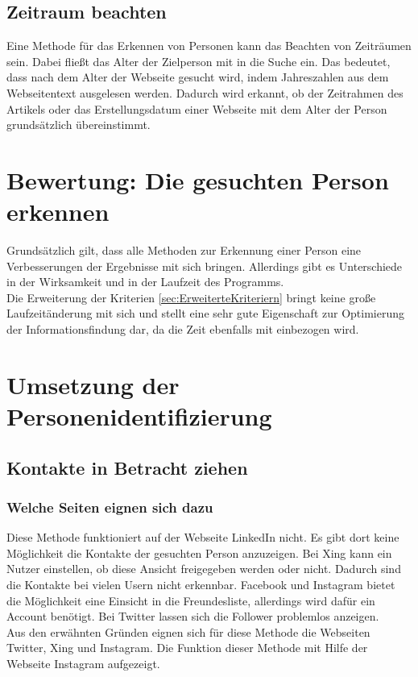 	\subsection{Zeitraum beachten}
	Eine Methode für das Erkennen von Personen kann das Beachten von Zeiträumen sein. Dabei fließt das Alter der Zielperson mit in die Suche ein. Das bedeutet, dass nach dem Alter der Webseite gesucht wird, indem Jahreszahlen aus dem Webseitentext ausgelesen werden. Dadurch wird erkannt, ob der Zeitrahmen des Artikels oder das Erstellungsdatum einer Webseite mit dem Alter der Person grundsätzlich übereinstimmt.
	
	
\section{Bewertung: Die gesuchten Person erkennen}
Grundsätzlich gilt, dass alle Methoden zur Erkennung einer Person eine Verbesserungen der Ergebnisse mit sich bringen. Allerdings gibt es Unterschiede in der Wirksamkeit und in der Laufzeit des Programms.\\
Die Erweiterung der Kriterien \ref{sec:ErweiterteKriteriern} bringt keine große Laufzeitänderung mit sich und stellt eine sehr gute Eigenschaft zur Optimierung der Informationsfindung dar, da die Zeit ebenfalls mit einbezogen wird.

\section{Umsetzung der Personenidentifizierung}
	\subsection{Kontakte in Betracht ziehen}
		\subsubsection{Welche Seiten eignen sich dazu}
		Diese Methode funktioniert auf der Webseite LinkedIn nicht. Es gibt dort keine Möglichkeit die Kontakte der gesuchten Person anzuzeigen. Bei Xing kann ein Nutzer einstellen, ob diese Ansicht freigegeben werden oder nicht. Dadurch sind die Kontakte bei vielen Usern nicht erkennbar. Facebook und Instagram bietet die Möglichkeit eine Einsicht in die Freundesliste, allerdings wird dafür ein Account benötigt. Bei Twitter lassen sich die Follower problemlos anzeigen.\\
		Aus den erwähnten Gründen eignen sich für diese Methode die Webseiten Twitter, Xing und Instagram. Die Funktion dieser Methode mit Hilfe der  Webseite Instagram aufgezeigt.
